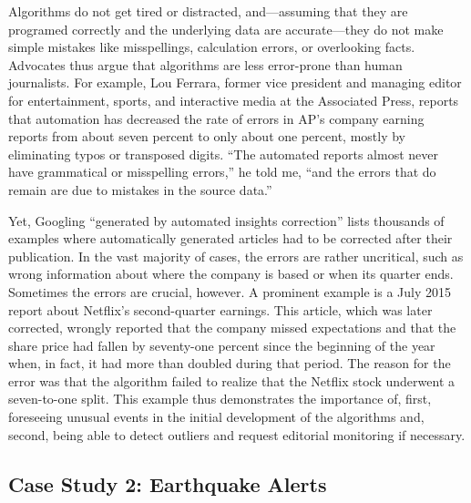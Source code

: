 \documentclass[notoc, symmetric, nobib, nols]{towcenter-book}
\begin{document}
Algorithms do not get tired or distracted, and---assuming that they are programed correctly and the underlying data are accurate---they do not make simple mistakes like misspellings, calculation errors, or overlooking facts. Advocates thus argue that algorithms are less error-prone than human journalists. For example, Lou Ferrara, former vice president and managing editor for entertainment, sports, and interactive media at the Associated Press, reports that automation has decreased the rate of errors in AP’s company earning reports from about seven percent to only about one percent, mostly by eliminating typos or transposed digits. ``The automated reports almost never have grammatical or misspelling errors,'' he told me, ``and the errors that do remain are due to mistakes in the source data.''

Yet, Googling ``generated by automated insights correction'' lists thousands of examples where automatically generated articles had to be corrected after their publication.\cite{diak15} In the vast majority of cases, the errors are rather uncritical, such as wrong information about where the company is based or when its quarter ends. Sometimes the errors are crucial, however. A prominent example is a July 2015 report about Netflix’s second-quarter earnings.\cite{ap15_2} This article, which was later corrected, wrongly reported that the company missed expectations and that the share price had fallen by seventy-one percent since the beginning of the year when, in fact, it had more than doubled during that period. The reason for the error was that the algorithm failed to realize that the Netflix stock underwent a seven-to-one split. This example thus demonstrates the importance of, first, foreseeing unusual events in the initial development of the algorithms and, second, being able to detect outliers and request editorial monitoring if necessary.\cite{leco15}

\subsection{Case Study 2: Earthquake Alerts}
\end{document}
